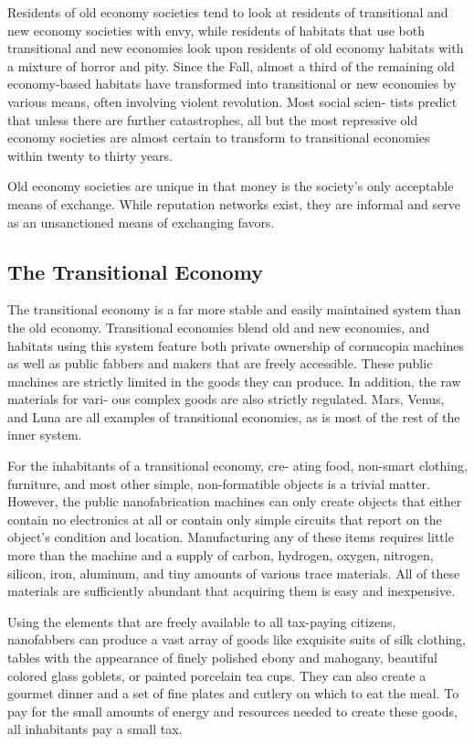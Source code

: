 Residents of old economy societies tend to look at 
residents of transitional and new economy societies 
with envy, while residents of habitats that use both 
transitional and new economies look upon residents 
of old economy habitats with a mixture of horror and 
pity. Since the Fall, almost a third of the remaining 
old economy-based habitats have transformed into 
transitional or new economies by various means, 
often involving violent revolution. Most social scien-
tists predict that unless there are further catastrophes, 
all but the most repressive old economy societies are 
almost certain to transform to transitional economies 
within twenty to thirty years.

Old economy societies are unique in that money is 
the society's only acceptable means of exchange. While 
reputation networks exist, they are informal and serve 
as an unsanctioned means of exchanging favors.

\subsection{The Transitional Economy}

The transitional economy is a far more stable and 
easily maintained system than the old economy. 
Transitional economies blend old and new economies, 
and habitats using this system feature both private 
ownership of cornucopia machines as well as public 
fabbers and makers that are freely accessible. These 
public machines are strictly limited in the goods they 
can produce. In addition, the raw materials for vari-
ous complex goods are also strictly regulated. Mars, 
Venus, and Luna are all examples of transitional 
economies, as is most of the rest of the inner system.

For the inhabitants of a transitional economy, cre-
ating food, non-smart clothing, furniture, and most 
other simple, non-formatible objects is a trivial matter. 
However, the public nanofabrication machines can 
only create objects that either contain no electronics 
at all or contain only simple circuits that report on the 
object's condition and location. Manufacturing any 
of these items requires little more than the machine 
and a supply of carbon, hydrogen, oxygen, nitrogen, 
silicon, iron, aluminum, and tiny amounts of various 
trace materials. All of these materials are sufficiently 
abundant that acquiring them is easy and inexpensive.

Using the elements that are freely available to all 
tax-paying citizens, nanofabbers can produce a vast 
array of goods like exquisite suits of silk clothing, 
tables with the appearance of finely polished ebony 
and mahogany, beautiful colored glass goblets, or 
painted porcelain tea cups. They can also create a 
gourmet dinner and a set of fine plates and cutlery on 
which to eat the meal. To pay for the small amounts 
of energy and resources needed to create these goods, 
all inhabitants pay a small tax.

